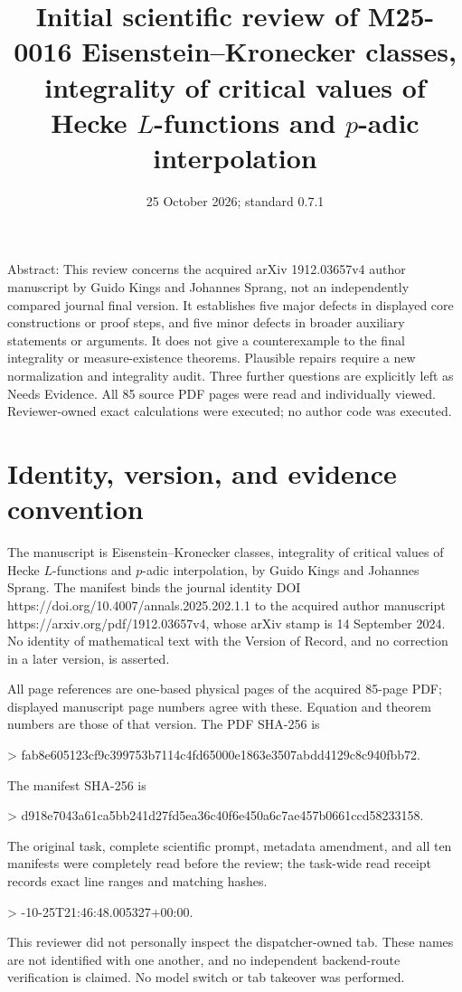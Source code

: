 \documentclass[10pt]{article}
\title{Initial scientific review of M25-0016
Eisenstein–Kronecker classes, integrality of critical values of Hecke \(L\)-functions and \(p\)-adic interpolation}
\author{}
\date{25 October 2026; standard 0.7.1}
\begin{document}
\maketitle
Abstract: This review concerns the acquired arXiv 1912.03657v4 author manuscript by Guido Kings and Johannes Sprang, not an independently compared journal final version. It establishes five major defects in displayed core constructions or proof steps, and five minor defects in broader auxiliary statements or arguments. It does not give a counterexample to the final integrality or measure-existence theorems. Plausible repairs require a new normalization and integrality audit. Three further questions are explicitly left as Needs Evidence. All 85 source PDF pages were read and individually viewed. Reviewer-owned exact calculations were executed; no author code was executed.\par
\section*{Identity, version, and evidence convention}
The manuscript is Eisenstein–Kronecker classes, integrality of critical values of Hecke \(L\)-functions and \(p\)-adic interpolation, by Guido Kings and Johannes Sprang. The manifest binds the journal identity DOI https://doi.org/10.4007/annals.2025.202.1.1 to the acquired author manuscript https://arxiv.org/pdf/1912.03657v4, whose arXiv stamp is 14 September 2024. No identity of mathematical text with the Version of Record, and no correction in a later version, is asserted.\par
All page references are one-based physical pages of the acquired 85-page PDF; displayed manuscript page numbers agree with these. Equation and theorem numbers are those of that version. The PDF SHA-256 is\par
> fab8e605123cf9c399753b7114c4fd65000e1863e3507abdd4129c8c940fbb72.\par
The manifest SHA-256 is\par
> d918e7043a61ca5bb241d27fd5ea36c40f6e450a6c7ae457b0661ccd58233158.\par
The original task, complete scientific prompt, metadata amendment, and all ten manifests were completely read before the review; the task-wide read receipt records exact line ranges and matching hashes.\par
> -10-25T21:46:48.005327+00:00.\par
This reviewer did not personally inspect the dispatcher-owned tab. These names are not identified with one another, and no independent backend-route verification is claimed. No model switch or tab takeover was performed.\par
\end{document}
